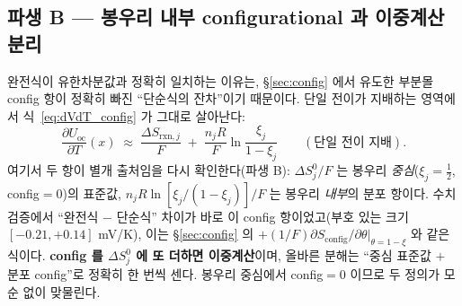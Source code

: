 \documentclass[11pt,a4paper]{article}
\newcommand{\rxn}{\mathrm{rxn}}
\newcommand{\oc}{\mathrm{oc}}
\newcommand{\config}{\mathrm{config}}
\begin{document}
\subsection{파생 B — 봉우리 내부 configurational 과 이중계산 분리}
완전식이 유한차분값과 정확히 일치하는 이유는, \S\ref{sec:config} 에서 유도한 부분몰 config 항이 정확히 빠진
``단순식의 잔차''이기 때문이다. 단일 전이가 지배하는 영역에서 식~\eqref{eq:dVdT_config} 가 그대로 살아난다:
\begin{equation}
\frac{\partial U_\oc}{\partial T}(x)\;\approx\;\frac{\Delta S_{\rxn,j}}{F}\;+\;\frac{n_jR}{F}\ln\!\frac{\xi_j}{1-\xi_j}
\qquad(\text{단일 전이 지배}).
\label{eq:single_config}
\end{equation}
여기서 두 항이 별개 출처임을 다시 확인한다(파생 B): $\Delta S^0_j/F$ 는 봉우리 \emph{중심}($\xi_j=\tfrac12$,
config$=0$)의 표준값, $n_jR\ln[\xi_j/(1-\xi_j)]/F$ 는 봉우리 \emph{내부}의 분포 항이다. 수치 검증에서 ``완전식
$-$ 단순식'' 차이가 바로 이 config 항이었고(부호 있는 크기 $[-0.21,+0.14]$ mV/K), 이는 \S\ref{sec:config} 의
$+(1/F)\partial S_\config/\partial\theta|_{\theta=1-\xi}$ 와 같은 식이다. \textbf{config 를 $\Delta S^0_j$ 에 또 더하면
이중계산}이며, 올바른 분해는 ``중심 표준값 $+$ 분포 config''로 정확히 한 번씩 센다. 봉우리 중심에서 config$=0$
이므로 두 정의가 모순 없이 맞물린다.
\end{document}
